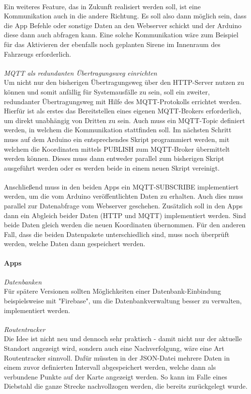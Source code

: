 \\
Ein weiteres Feature, das in Zukunft realisiert werden soll, ist eine Kommunikation auch in die andere Richtung. Es soll also dann möglich sein, dass die App Befehle oder sonstige Daten an den Webserver schickt und der Arduino diese dann auch abfragen kann. Eine solche Kommunikation wäre zum Beispiel für das Aktivieren der ebenfalls noch geplanten Sirene im Innenraum des Fahrzeugs erforderlich.
\\
\\
\textit{MQTT als redundanten Übertragungsweg einrichten}
\\
Um nicht nur den bisherigen Übertragungsweg über den HTTP-Server nutzen zu können und somit anfällig für Systemausfälle zu sein, soll ein zweiter, redundanter Übertragungsweg mit Hilfe des MQTT-Protokolls errichtet werden. Hierfür ist als erstes das Bereitstellen eines eigenen MQTT-Brokers erforderlich, um direkt unabhängig von Dritten zu sein. Auch muss ein MQTT-Topic definiert werden, in welchem die Kommunikation stattfinden soll. Im nächsten Schritt muss auf dem Arduino ein entsprechendes Skript programmiert werden, mit welchem die Koordinaten mittels PUBLISH zum MQTT-Broker übermittelt werden können. Dieses muss dann entweder parallel zum bisherigen Skript ausgeführt werden oder es werden beide in einem neuen Skript vereinigt.
\\
\\
Anschließend muss in den beiden Apps ein MQTT-SUBSCRIBE implementiert werden, um die vom Arduino veröffentlichten Daten zu erhalten. Auch dies muss parallel zur Datenabfrage vom Webserver geschehen. Zusätzlich soll in den Apps dann ein Abgleich beider Daten (HTTP und MQTT) implementiert werden. Sind beide Daten gleich werden die neuen Koordinaten übernommen. Für den anderen Fall, dass die beiden Datenpakete unterschiedlich sind, muss noch überprüft werden, welche Daten dann gespeichert werden. 
\\
\\
\textbf{Apps} 
\\
\\
\textit{Datenbanken}
\\
Für spätere Versionen sollten  Möglichkeiten einer Datenbank-Einbindung beispielsweise mit "Firebase", um die Datenbankverwaltung besser zu verwalten, implementiert werden. 
\\
\\
\textit{Routentracker}
\\
Die Idee ist nicht neu und dennoch sehr praktisch - damit nicht nur der aktuelle Standort angezeigt wird, sondern auch eine Nachverfolgung, wäre eine Art Routentracker sinnvoll. Dafür müssten in der JSON-Datei mehrere Daten in einem zuvor definierten Intervall abgespeichert werden, welche dann als verbundene Punkte auf der Karte angezeigt werden. So kann im Falle eines Diebstahl die ganze Strecke nachvollzogen werden, die bereits zurückgelegt wurde.
